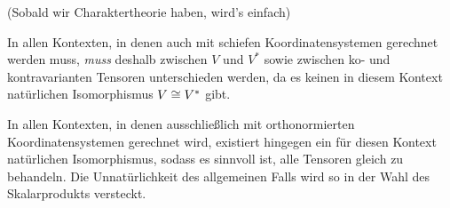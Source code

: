 \begin{sheet}
\begin{problem}[title={(Nicht-)Isomorphie von $V$ und $V^\ast$}]
\begin{subproblem}[difficulty={schwerer als man denkt}]
(Sobald wir Charaktertheorie haben, wird's einfach)
\end{subproblem}
\end{problem}

\begin{remark}
In allen Kontexten, in denen auch mit schiefen Koordinatensystemen gerechnet werden muss, \emph{muss} deshalb zwischen $V$ und $V^\ast$ sowie zwischen ko- und kontravarianten Tensoren unterschieden werden, da es keinen in diesem Kontext natürlichen Isomorphismus $V\cong V^\ast$ gibt.

In allen Kontexten, in denen ausschließlich mit orthonormierten Koordinatensystemen gerechnet wird, existiert hingegen ein für diesen Kontext natürlichen Isomorphismus, sodass es sinnvoll ist, alle Tensoren gleich zu behandeln. Die Unnatürlichkeit des allgemeinen Falls wird so in der Wahl des Skalarprodukts versteckt.
\end{remark}
	
\end{sheet}